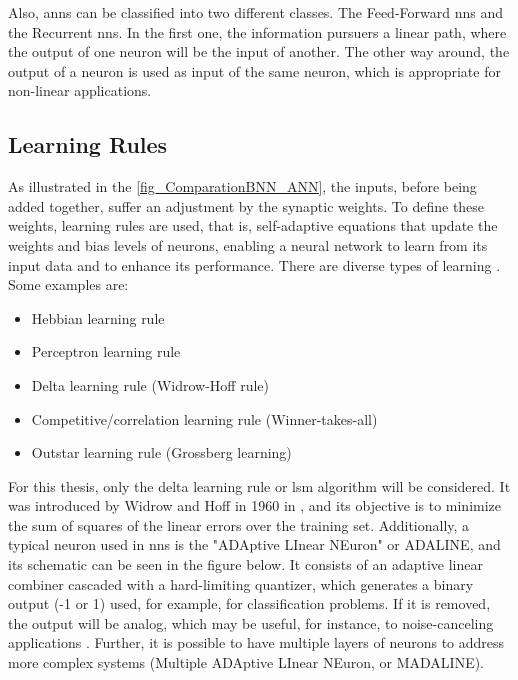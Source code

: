 Also, \glspl{ann} can be classified into two different classes. The Feed-Forward \glspl{nn} and the Recurrent \glspl{nn}. In the first one, 
the information pursuers a linear path, where the output of one neuron will be the input of another. The other way around, the output of a 
neuron is used as input of the same neuron, which is appropriate for non-linear applications. 

\subsection{Learning Rules}

As illustrated in the \autoref{fig_ComparationBNN_ANN}, the inputs, before being added together, suffer an adjustment by the synaptic weights. 
To define these weights, learning rules are used, that is, self-adaptive equations that update the weights and bias levels of neurons, enabling 
a neural network to learn from its input data and to enhance its performance. There are diverse types of learning \cite{haykin2009neural}. Some 
examples are:

\begin{itemize}
    \item Hebbian learning rule
    \item Perceptron learning rule
    \item Delta learning rule (Widrow-Hoff rule)
    \item Competitive/correlation learning rule (Winner-takes-all)
    \item Outstar learning rule (Grossberg learning)
\end{itemize}

For this thesis, only the delta learning rule or \gls{lsm} algorithm will be considered. It was introduced by Widrow and Hoff in 1960 in 
\cite{widrow1960adaptive}, and its objective is to minimize the sum of squares of the linear errors over the training set. Additionally, 
a typical neuron used in \glspl{nn} is the "ADAptive LInear NEuron" or ADALINE, and its schematic can be seen in the 
figure below. It consists of an adaptive linear combiner cascaded with a 
hard-limiting quantizer, which generates a binary output (-1 or 1) used, for example, for classification problems. If it is removed, 
the output will be analog, which may be useful, for instance, to noise-canceling applications 
\cite{widrow1985adaptive}. Further, it is possible to have multiple layers of neurons to address more complex systems (Multiple ADAptive 
LInear NEuron, or MADALINE).

